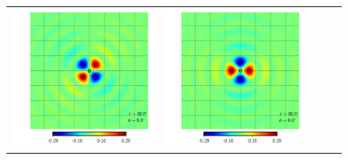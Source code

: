 \documentclass[a4paper,11pt]{article}
\begin{document}
\begin{figure}[t]
\begin{center}
\begin{tabular}{m{8ex}m{}m{}|m{}m{}}
\hspace{\kernelfigspace}\includegraphics[width=\kernelfigwidth]{qu2eb_iker_rad_lat0_lon90.pdf} &
\hspace{\kernelfigspace}\includegraphics[width=\kernelfigwidth]{qu2eb_rker_con_lat0_lon90.pdf} &

\end{tabular}
\end{center}
\end{figure}
\end{document}
